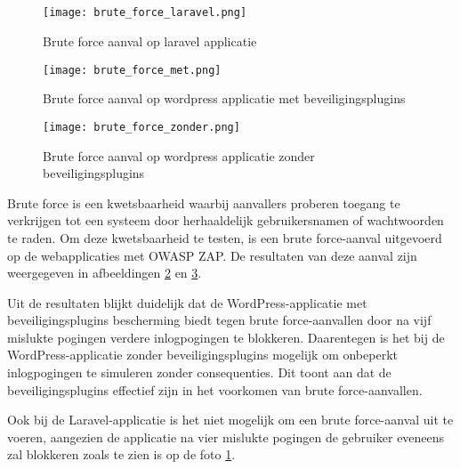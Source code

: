 \subsection{}
\begin{figure}
    \centering
    \texttt{[image: brute\_force\_laravel.png]}
    \caption[Brute force aanval op laravel applicatie]{Brute force aanval op laravel applicatie}
    \label{fig:brute_force_laravel}
\end{figure}
\begin{figure}
    \centering
    \texttt{[image: brute\_force\_met.png]}
    \caption[Brute force aanval op wordpress applicatie met beveiligingsplugins]{Brute force aanval op wordpress applicatie met beveiligingsplugins}
    \label{fig:brute_force_met}
\end{figure}
\begin{figure}
    \centering
    \texttt{[image: brute\_force\_zonder.png]}
    \caption[Brute force aanval op wordpress applicatie zonder beveiligingsplugins]{Brute force aanval op wordpress applicatie zonder beveiligingsplugins}
    \label{fig:brute_force_zonder}
\end{figure}

Brute force is een kwetsbaarheid waarbij aanvallers proberen toegang te verkrijgen tot een systeem door herhaaldelijk gebruikersnamen 
of wachtwoorden te raden. Om deze kwetsbaarheid te testen, is een brute force-aanval uitgevoerd op de webapplicaties met OWASP ZAP. De 
resultaten van deze aanval zijn weergegeven in afbeeldingen \ref{fig:brute_force_met} en \ref{fig:brute_force_zonder}. 

Uit de resultaten blijkt duidelijk dat de WordPress-applicatie met beveiligingsplugins bescherming biedt tegen brute 
force-aanvallen door na vijf mislukte pogingen verdere inlogpogingen te blokkeren. Daarentegen is het bij de 
WordPress-applicatie zonder beveiligingsplugins mogelijk om onbeperkt inlogpogingen te simuleren zonder consequenties. Dit toont 
aan dat de beveiligingsplugins effectief zijn in het voorkomen van brute force-aanvallen.

Ook bij de Laravel-applicatie is het niet mogelijk om een brute force-aanval uit te voeren, aangezien de applicatie na vier 
mislukte pogingen de gebruiker eveneens zal blokkeren zoals te zien is op de foto \ref{fig:brute_force_laravel}.
